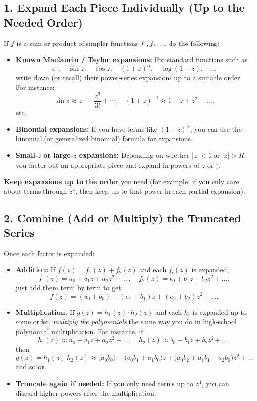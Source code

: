 \documentclass[12pt]{article}
\theoremstyle{definition} %
\theoremstyle{plain} %
\begin{document}
\subsection*{1. Expand Each Piece Individually (Up to the Needed Order)}

If $f$ is a sum or product of simpler functions $f_1, f_2, \dots$, do the following:

\begin{itemize}
  \item \textbf{Known Maclaurin / Taylor expansions:} For standard functions such as
  \[
  e^z,\quad \sin z,\quad \cos z,\quad (1+z)^\alpha,\quad \log(1+z), \quad \dots
  \]
  write down (or recall) their power‐series expansions up to a suitable order. For instance:
  \[
  \sin z \approx z \;-\;\frac{z^3}{3!} + \cdots, 
  \quad
  (1+z)^{-1} \approx 1 - z + z^2 - \dots,
  \]
  etc.
  \item \textbf{Binomial expansions:} If you have terms like $(1+z)^\alpha$, you can use the binomial (or generalized binomial) formula for expansions.  
  \item \textbf{Small-$z$ or large-$z$ expansions:} Depending on whether $|z|<1$ or $|z|>R$, you factor out an appropriate piece and expand in powers of $z$ or $\tfrac{1}{z}$.
\end{itemize}

\textbf{Keep expansions up to the order} you need (for example, if you only care about terms through $z^4$, then keep up to that power in each partial expansion).

\subsection*{2. Combine (Add or Multiply) the Truncated Series}

Once each factor is expanded:

\begin{itemize}
  \item \textbf{Addition:} If $f(z)=f_1(z)+f_2(z)$ and each $f_i(z)$ is expanded,
  \[
  f_1(z) = a_0 + a_1 z + a_2 z^2 + \dots, 
  \quad
  f_2(z) = b_0 + b_1 z + b_2 z^2 + \dots,
  \]
  just add them term by term to get
  \[
  f(z) = (a_0 + b_0) + (a_1 + b_1)z + (a_2 + b_2)z^2 + \dots.
  \]
  
  \item \textbf{Multiplication:} If $g(z)=h_1(z)\cdot h_2(z)$ and each $h_i$ is expanded up to some order, \emph{multiply the polynomials} the same way you do in high‐school polynomial multiplication. For instance, if
  \[
  h_1(z) \approx a_0 + a_1 z + a_2 z^2 + \dots,
  \quad
  h_2(z) \approx b_0 + b_1 z + b_2 z^2 + \dots,
  \]
  then
  \[
  g(z) = h_1(z)\,h_2(z) \approx \bigl(a_0 b_0\bigr) + \bigl(a_0 b_1 + a_1 b_0\bigr)z + \bigl(a_0 b_2 + a_1 b_1 + a_2 b_0\bigr)z^2 + \dots
  \]
  and so on. 
  \item \textbf{Truncate again if needed:} If you only need terms up to $z^4$, you can discard higher powers after the multiplication.
\end{itemize}
\end{document}
